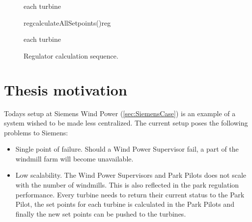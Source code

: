 
\begin{figure}
	\centering
	\begin{sequencediagram} %
	
		\begin{sdblock}{each turbine}{}
		\end{sdblock}
		
		\begin{call}{reg}{calculateAllSetpoints()}{reg}{}
		\end{call}
	
		\begin{sdblock}{each turbine}{}
		\end{sdblock}
					
	\end{sequencediagram}

	\caption[Regulator calculation sequence]{
		\label{fig:dataComputationSequence} 
		\footnotesize{%
			Regulator calculation sequence.
		}
	}
\end{figure}

\section{Thesis motivation}

Todays setup at Siemens Wind Power (\cref{sec:SiemensCase}) is an example of a system wished to be made less centralized. The current setup poses the following problems to Siemens:  

\begin{itemize} 
	\item Single point of failure. Should a  Wind Power Supervisor fail, a part of the windmill farm will become unavailable.
	\item Low scalability. The  Wind Power Supervisors and Park Pilots does not scale with the number of windmills. This is also reflected in the park regulation performance. Every turbine needs to return their current status to the Park Pilot, the set points for each turbine is calculated in the Park Pilots and finally the new set points can be pushed to the turbines.
\end{itemize}

